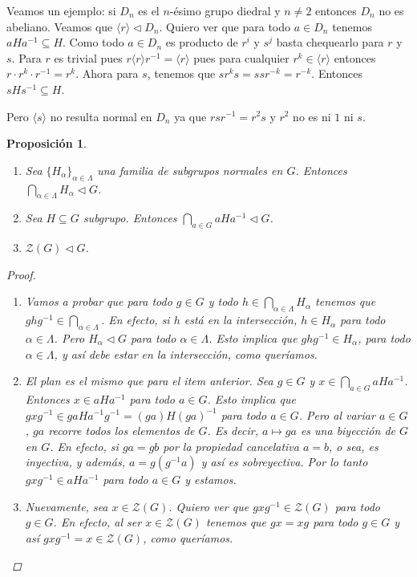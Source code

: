 \documentclass[12pt]{book}
\newtheorem{prop}[teo]{Proposición}
\theoremstyle{definition}
\begin{document}
Veamos un ejemplo: si $D_n$ es el $n$-ésimo grupo diedral y $n\neq 2$ entonces $D_n$ no es abeliano. Veamos que $\langle r\rangle \triangleleft D_n$. Quiero ver que para todo $a\in D_n$ tenemos $aHa^{-1}\subseteq H$. Como todo $a\in D_n$ es producto de $r^i$ y $s^j$ basta chequearlo para $r$ y $s$. Para $r$ es trivial pues $r\langle r\rangle r^{-1} = \langle r\rangle$ pues para cualquier $r^k\in \langle r\rangle$ entonces $r\cdot r^k \cdot r^{-1} = r^k$. Ahora para $s$, tenemos que $sr^ks = s sr^{-k} = r^{-k}$. Entonces $sHs^{-1} \subseteq H$.

Pero $\langle s\rangle$ no resulta normal en $D_n$ ya que $rsr^{-1} = r^2 s$ y $r^2$ no es ni $1$ ni $s$.

\begin{prop}\begin{enumerate}
\item Sea $\{H_\alpha\}_{\alpha\in \Lambda}$ una familia de subgrupos normales en $G$. Entonces $\bigcap_{\alpha\in\Lambda}H_\alpha \triangleleft G$.
\item Sea $H\subseteq G$ subgrupo. Entonces $\bigcap_{a\in G}aHa^{-1} \triangleleft G$.
\item $\mathcal{Z}(G)\triangleleft G$.
\end{enumerate}
\begin{proof}
\begin{enumerate}
\item Vamos a probar que para todo $g\in G$ y todo $h\in \bigcap_{\alpha\in\Lambda}H_\alpha$ tenemos que $ghg^{-1}\in \bigcap_{\alpha\in\Lambda}$. En efecto, si $h$ está en la intersección, $h\in H_\alpha$ para todo $\alpha\in\Lambda$. Pero $H_\alpha\triangleleft G$ para todo $\alpha\in\Lambda$. Esto implica que $ghg^{-1}\in H_\alpha$, para todo $\alpha\in\Lambda$, y así debe estar en la intersección, como queríamos.
\item El plan es el mismo que para el item anterior. Sea $g\in G$ y $x\in \bigcap_{a\in G}aHa^{-1}$. Entonces $x\in aHa^{-1}$ para todo $a\in G$. Esto implica que $gxg^{-1} \in gaHa^{-1}g^{-1} = (ga)H(ga)^{-1}$ para todo $a\in G$. Pero al variar $a\in G$, $ga$ recorre todos los elementos de $G$. Es decir, $a\mapsto ga$ es una biyección de $G$ en $G$. En efecto, si $ga=gb$ por la propiedad cancelativa $a=b$, o sea, es inyectiva, y además, $a = g(g^{-1}a)$ y así es sobreyectiva. Por lo tanto $gxg^{-1}\in aHa^{-1}$ para todo $a\in G$ y estamos.
\item Nuevamente, sea $x\in \mathcal{Z}(G)$. Quiero ver que $gxg^{-1}\in \mathcal{Z}(G)$ para todo $g\in G$. En efecto, al ser $x\in\mathcal{Z}(G)$ tenemos que $gx = xg$ para todo $g\in G$ y así $gxg^{-1} = x \in \mathcal{Z}(G)$, como queríamos.
\end{enumerate}
\end{proof}
\end{prop}
\end{document}
